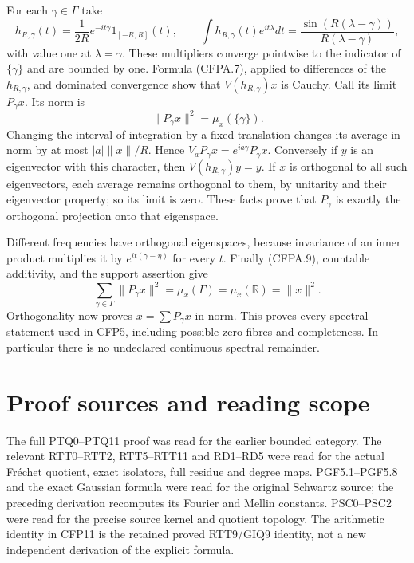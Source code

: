 For each \(\gamma\in\Gamma\) take \[
h_{R,\gamma}(t)=\frac1{2R}e^{-it\gamma}1_{[-R,R]}(t),
\qquad
\int h_{R,\gamma}(t)e^{it\lambda}dt
=\frac{\sin(R(\lambda-\gamma))}{R(\lambda-\gamma)},
\tag{CFPA.8}
\] with value one at \(\lambda=\gamma\). These multipliers converge
pointwise to the indicator of \(\{\gamma\}\) and are bounded by one.
Formula (CFPA.7), applied to differences of the \(h_{R,\gamma}\), and
dominated convergence show that \(V(h_{R,\gamma})x\) is Cauchy. Call its
limit \(P_\gamma x\). Its norm is \[
\|P_\gamma x\|^2=\mu_x(\{\gamma\}).
\tag{CFPA.9}
\] Changing the interval of integration by a fixed translation changes
its average in norm by at most \(|a|\|x\|/R\). Hence
\(V_aP_\gamma x=e^{ia\gamma}P_\gamma x\). Conversely if \(y\) is an
eigenvector with this character, then \(V(h_{R,\gamma})y=y\). If \(x\)
is orthogonal to all such eigenvectors, each average remains orthogonal
to them, by unitarity and their eigenvector property; so its limit is
zero. These facts prove that \(P_\gamma\) is exactly the orthogonal
projection onto that eigenspace.

Different frequencies have orthogonal eigenspaces, because invariance of
an inner product multiplies it by \(e^{it(\gamma-\eta)}\) for every
\(t\). Finally (CFPA.9), countable additivity, and the support assertion
give \[
\sum_{\gamma\in\Gamma}\|P_\gamma x\|^2
=\mu_x(\Gamma)=\mu_x(\mathbb R)=\|x\|^2.
\tag{CFPA.10}
\] Orthogonality now proves \(x=\sum P_\gamma x\) in norm. This proves
every spectral statement used in CFP5, including possible zero fibres
and completeness. In particular there is no undeclared continuous
spectral remainder.

\section{Proof sources and reading
scope}\label{proof-sources-and-reading-scope}

The full PTQ0--PTQ11 proof was read for the earlier bounded category.
The relevant RTT0--RTT2, RTT5--RTT11 and RD1--RD5 were read for the
actual Fréchet quotient, exact isolators, full residue and degree maps.
PGF5.1--PGF5.8 and the exact Gaussian formula were read for the original
Schwartz source; the preceding derivation recomputes its Fourier and
Mellin constants. PSC0--PSC2 were read for the precise source kernel and
quotient topology. The arithmetic identity in CFP11 is the retained
proved RTT9/GIQ9 identity, not a new independent derivation of the
explicit formula.

